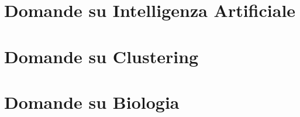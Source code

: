 \section{Domande su Intelligenza Artificiale}


\section{Domande su Clustering}


\section{Domande su Biologia}




